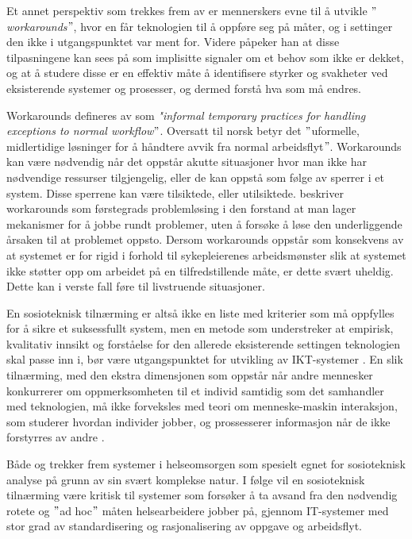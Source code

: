 \noindent
Et annet perspektiv som trekkes frem av \citet{Coiera07} er mennerskers evne til å utvikle \emph{$"$workarounds$"$}, hvor en får teknologien til å oppføre seg på måter, og i settinger den ikke i utgangspunktet var ment for. Videre påpeker han at disse tilpasningene kan sees på som  implisitte signaler om et behov som ikke er dekket, og at å studere disse er en effektiv måte å identifisere styrker og svakheter ved eksisterende systemer og prosesser, og dermed forstå hva som må endres. 

\noindent
Workarounds defineres av \citet{Kobayashi05} som \emph{"informal temporary practices for handling exceptions to normal workflow$"$}. Oversatt til norsk betyr det $"$uformelle, midlertidige løsninger for å håndtere avvik fra normal arbeidsflyt$"$.
Workarounds kan være nødvendig når det oppstår akutte situasjoner hvor man ikke har nødvendige ressurser tilgjengelig, eller de kan oppstå som følge av sperrer i et system. Disse sperrene kan være tilsiktede, eller utilsiktede. \citet{Vogelsmeier08} beskriver workarounds som førstegrads problemløsing i den forstand at man lager mekanismer for å jobbe rundt problemer, uten å forsøke å løse den underliggende årsaken til at problemet oppsto. Dersom workarounds oppstår som konsekvens av at systemet er for rigid i forhold til sykepleierenes arbeidsmønster slik at systemet ikke støtter opp om arbeidet på en tilfredstillende måte, er dette svært uheldig. Dette kan i verste fall føre til livstruende situasjoner.

\noindent
En sosioteknisk tilnærming er altså ikke en liste med kriterier som må oppfylles for å sikre et suksessfullt system, men en metode som understreker at empirisk, kvalitativ innsikt og forståelse for den allerede eksisterende settingen teknologien skal passe inn i, bør være utgangspunktet for utvikling av IKT-systemer \citep{Berg99}. En slik tilnærming, med den ekstra dimensjonen som oppstår når andre mennesker konkurrerer om oppmerksomheten til et individ samtidig som det samhandler med teknologien, må ikke forveksles med teori om menneske-maskin interaksjon, som studerer hvordan individer jobber, og prossesserer informasjon når de ikke forstyrres av andre \citep{Coiera07}.

\noindent
Både \citet{Coiera07} og \citet{Berg99} trekker frem systemer i helseomsorgen som spesielt egnet for sosioteknisk analyse på grunn av sin svært komplekse natur. I følge \citet{Berg99} vil en sosioteknisk tilnærming være kritisk til systemer som forsøker å ta avsand fra den nødvendig rotete og $"$ad hoc$"$ måten helsearbeidere jobber på, gjennom IT-systemer med stor grad av standardisering og rasjonalisering av oppgave og arbeidsflyt.






